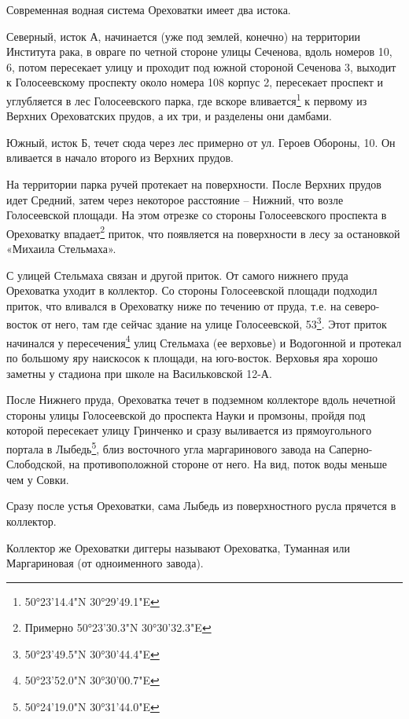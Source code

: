 Современная водная система Ореховатки имеет два истока.

Северный, исток А, начинается (уже под землей, конечно) на территории Института рака, в овраге по четной стороне улицы Сеченова, вдоль номеров 10, 6, потом пересекает улицу и проходит под южной стороной Сеченова 3, выходит к Голосеевскому проспекту около номера 108 корпус 2, пересекает проспект и углубляется в лес Голосеевского парка, где вскоре вливается\footnote{50°23'14.4"N 30°29'49.1"E}  к первому из Верхних Ореховатских прудов, а их три, и разделены они дамбами.

Южный, исток Б, течет сюда через лес примерно от ул. Героев Обороны, 10. Он вливается в начало второго из Верхних прудов.

На территории парка ручей протекает на поверхности. После Верхних прудов идет Средний, затем через некоторое расстояние – Нижний, что возле Голосеевской площади. На этом отрезке со стороны Голосеевского проспекта в Ореховатку впадает\footnote{Примерно 50°23'30.3"N 30°30'32.3"E} приток, что появляется на поверхности в лесу за остановкой «Михаила Стельмаха». 

С улицей Стельмаха связан и другой приток. 
От самого нижнего пруда Ореховатка уходит в коллектор. Со стороны Голосеевской площади подходил приток, что вливался в Ореховатку ниже по течению от пруда, т.е. на северо-восток от него, там где сейчас здание на улице Голосеевской, 53\footnote{50°23'49.5"N 30°30'44.4"E}. Этот приток начинался у пересечения\footnote{50°23'52.0"N 30°30'00.7"E} улиц Стельмаха (ее верховье) и Водогонной и протекал по большому яру наискосок к площади, на юго-восток. Верховья яра хорошо заметны у стадиона при школе на Васильковской 12-А.

После Нижнего пруда, Ореховатка течет в подземном коллекторе вдоль нечетной стороны улицы Голосеевской до проспекта Науки и промзоны, пройдя под которой пересекает улицу Гринченко и сразу выливается из прямоугольного портала в Лыбедь\footnote{50°24'19.0"N 30°31'44.0"E}, близ восточного угла маргаринового завода на Саперно-Слободской, на противоположной стороне от него. На вид, поток воды меньше чем у Совки.

Сразу после устья Ореховатки, сама Лыбедь из поверхностного русла прячется в коллектор.

Коллектор же Ореховатки диггеры называют Ореховатка, Туманная или Маргариновая (от одноименного завода).\\


\medskip


